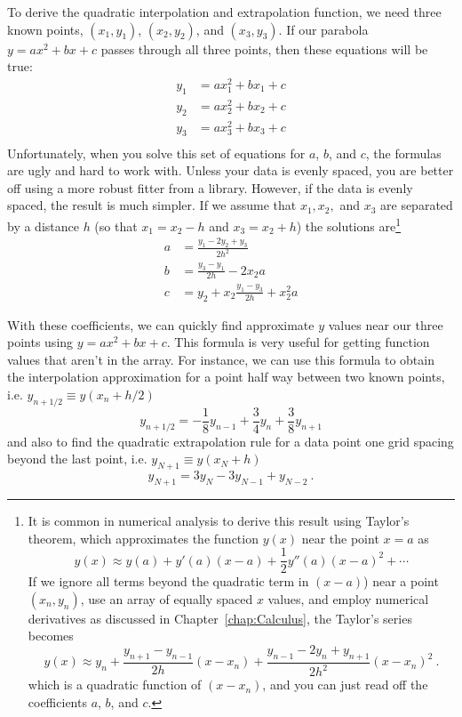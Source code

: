 
To derive the quadratic interpolation and extrapolation function,
we need three known points, $(x_1,y_1)$,
$(x_2,y_2)$, and $(x_3,y_3)$.  If our parabola $y=a x^2 + bx + c$ passes through all three points, then these equations will be true:
\begin{equation}
    \begin{aligned}
    y_1 &= a x_1^2 + bx_1 + c \\
    y_2 &= a x_2^2 + bx_2 + c \\
    y_3 &= a x_3^2 + bx_3 + c \\
    \end{aligned}
\end{equation}
Unfortunately, when you solve this set of equations for $a$, $b$,
and $c$, the formulas are ugly and hard to work with. Unless your data is evenly spaced, you are better off using a more robust fitter from a library.  However, if the data is evenly spaced, the result is much simpler.  If we assume that $x_1,x_2,$ and $x_3$ are separated by a distance $h$ (so
that $x_1=x_2-h$ and $x_3=x_2+h$) the solutions
are\footnote{It is common in numerical analysis to derive this
result using  Taylor's theorem, which
approximates the function $y(x)$ near the point $x=a$ as
\[
y(x) \approx y(a) + y'(a)(x-a) + \frac{1}{2} y''(a) (x-a)^2 + \cdots
\]
If we ignore all terms beyond the quadratic term in $(x-a)$) near a
point $(x_n,y_n)$, use an array of equally spaced $x$ values, and
employ numerical derivatives as discussed in
Chapter~\ref{chap:Calculus}, the Taylor's series becomes
\[
y(x) \approx y_n + \frac{y_{n+1}-y_{n-1} }{ 2 h} (x-x_n)
+ \frac{y_{n-1}-2 y_n + y_{n+1} }{ 2 h^2} (x-x_n)^2 ~.
\]
which is a quadratic function of $(x-x_n)$, and you can just read off the coefficients $a$, $b$, and $c$.
}
\begin{equation}
    \begin{aligned}
    a &= \frac{y_1-2y_2+y_3}{2h^2} \\
    b &= \frac{y_3-y_1}{2h} -2x_2 a \\
    c &= y_2 + x_2 \frac{y_1-y_3}{2h} + x_2^2 a
    \end{aligned}
\end{equation}

With these coefficients, we can quickly find approximate $y$ values
near our three points using $y=a x^2 + bx + c$. This formula is
very useful for getting function values that aren't in the array.
For instance, we can use this formula to obtain the interpolation
approximation for a point half way between two known points, i.e.
$y_{n+1/2} \equiv y(x_n+h/2)$
\begin{equation}
y_{n+1/2} = -\frac{1}{8} y_{n-1} + \frac{3}{4} y_n + \frac{3}{8}
y_{n+1}
\end{equation}
and also to find the quadratic extrapolation rule for a data point
one grid spacing beyond the last point, i.e. $y_{N+1} \equiv y(x_N
+ h)$
\begin{equation}
y_{N+1} = 3 y_N - 3 y_{N-1} + y_{N-2} ~.
\end{equation}



